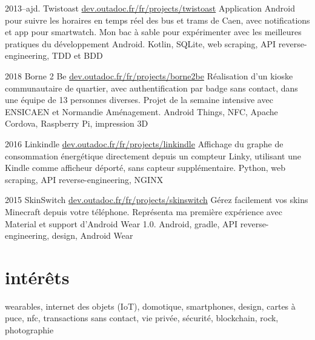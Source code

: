\documentclass[]{friggeri-cv}
\begin{document}
\begin{entrylist}
	 \entry
	{2013--ajd.}
	{Twistoast}
	{\href{https://dev.outadoc.fr/fr/projects/twistoast}{dev.outadoc.fr/fr/projects/twistoast}}
	{Application Android pour suivre les horaires en temps réel des bus et trams de Caen, avec notifications et app pour smartwatch. Mon bac à sable pour expérimenter avec les meilleures pratiques du développement Android.}
	{Kotlin, SQLite, web scraping, API reverse-engineering, TDD et BDD}
	
	\entry
	{2018}
	{Borne 2 Be}
	{\href{https://dev.outadoc.fr/fr/projects/borne2be}{dev.outadoc.fr/fr/projects/borne2be}}
	{Réalisation d'un kioske communautaire de quartier, avec authentification par badge sans contact, dans une équipe de 13 personnes diverses. Projet de la semaine intensive avec ENSICAEN et Normandie Aménagement.}
	{Android Things, NFC, Apache Cordova, Raspberry Pi, impression 3D}
	
	\entry
	{2016}
	{Linkindle}
	{\href{https://dev.outadoc.fr/fr/projects/linkindle}{dev.outadoc.fr/fr/projects/linkindle}}
	{Affichage du graphe de consommation énergétique directement depuis un compteur Linky, utilisant une Kindle comme afficheur déporté, sans capteur supplémentaire.}
	{Python, web scraping, API reverse-engineering, NGINX}
	
 	\entry
	{2015}
	{SkinSwitch}
	{\href{https://dev.outadoc.fr/fr/projects/skinswitch}{dev.outadoc.fr/fr/projects/skinswitch}}
	{Gérez facilement vos skins Minecraft depuis votre téléphone. Représenta ma première expérience avec Material et support d'Android Wear 1.0.}
	{Android, gradle, API reverse-engineering, design, Android Wear}
    
\end{entrylist}

\section{intérêts}

wearables, internet des objets (IoT), domotique, smartphones, design, cartes à puce, nfc, transactions sans contact, vie privée, sécurité, blockchain, rock, photographie
\end{document}
